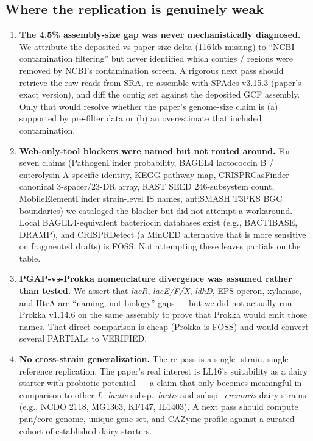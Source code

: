 \documentclass[11pt,letterpaper]{article}
\begin{document}
\subsection{Where the replication is genuinely weak}
\begin{enumerate}[leftmargin=1.4em]
\item \textbf{The 4.5\% assembly-size gap was never mechanistically
diagnosed.} We attribute the deposited-vs-paper size delta
(116\,kb missing) to ``NCBI contamination filtering'' but never
identified which contigs / regions were removed by NCBI's contamination
screen. A rigorous next pass should retrieve the raw reads from SRA,
re-assemble with SPAdes v3.15.3 (paper's exact version), and diff the
contig set against the deposited GCF assembly. Only that would resolve
whether the paper's genome-size claim is (a) supported by pre-filter
data or (b) an overestimate that included contamination.
\item \textbf{Web-only-tool blockers were named but not routed around.}
For seven claims (PathogenFinder probability, BAGEL4 lactococcin B / enterolysin A specific
identity, KEGG pathway map, CRISPRCasFinder canonical 3-spacer/23-DR
array, RAST SEED 246-subsystem count, MobileElementFinder strain-level
IS names, antiSMASH T3PKS BGC boundaries) we cataloged the blocker but
did not attempt a workaround. Local BAGEL4-equivalent bacteriocin
databases exist (e.g., BACTIBASE, DRAMP), and CRISPRDetect (a MinCED
alternative that is more sensitive on fragmented drafts) is FOSS.
Not attempting these leaves partials on the table.
\item \textbf{PGAP-vs-Prokka nomenclature divergence was assumed rather
than tested.} We assert that \emph{lacR}, \emph{lacE/F/X}, \emph{ldhD},
EPS operon, xylanase, and HtrA are ``naming, not biology'' gaps ---
but we did not actually run Prokka v1.14.6 on the same assembly to
prove that Prokka would emit those names. That direct comparison is
cheap (Prokka is FOSS) and would convert several PARTIALs to VERIFIED.
\item \textbf{No cross-strain generalization.} The re-pass is a single-
strain, single-reference replication. The paper's real interest is
LL16's suitability as a dairy starter with probiotic potential ---
a claim that only becomes meaningful in comparison to other
\emph{L. lactis} subsp.\ \emph{lactis} and subsp.\ \emph{cremoris}
dairy strains (e.g., NCDO 2118, MG1363, KF147, IL1403). A next pass
should compute pan/core genome, unique-gene-set, and CAZyme profile
against a curated cohort of established dairy starters.

\end{enumerate}
\end{document}
